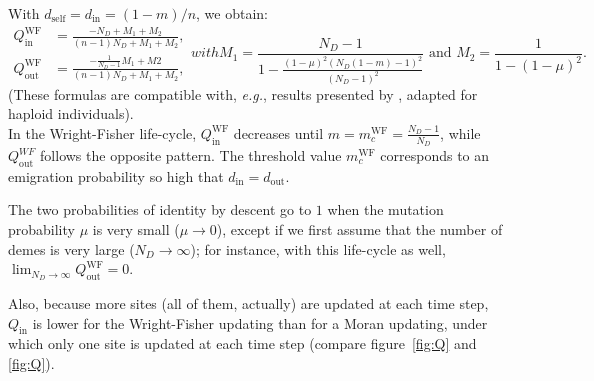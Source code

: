 \documentclass[11pt, letterpaper]{article}
\newcommand{\eg}{\textit{e.g.}}
\newcommand{\WF}{\textrm{WF}}
\newcommand{\self}{\textrm{self}}
\newcommand{\inn}{\textrm{in}}
\newcommand{\out}{\textrm{out}}
\newcommand{\din}{d_{\inn}}
\newcommand{\dself}{d_{\self}}
\newcommand{\dout}{d_{\out}}
\newcommand{\Qin}{Q_{\inn}}
\newcommand{\Qout}{Q_{\out}}
\newcommand{\ndemes}{N_D}
\begin{document}
With $\dself = \din = (1-m)/n$, we obtain:
%
\begin{subequations}\label{eq:QWF}
\begin{align}
\Qin^{\WF} &= \frac{-\ndemes + M_1 + M_2}{(n-1) \ndemes +M_1 + M_2}, \\
\Qout^{\WF} & = \frac{-\frac{1}{\ndemes-1}M_1 + M2}{(n-1) \ndemes +M_1 + M_2},
\end{align}
with
\begin{equation*}
M_1 = \frac{\ndemes-1}{1-\frac{(1-\mu )^2 (\ndemes (1-m)-1)^2}{(\ndemes-1)^2}} \textrm{ and }M_2 = \frac{1}{1-(1-\mu)^2}.
\end{equation*}
\end{subequations}
%
(These formulas are compatible with, \eg, results presented by \citet{CockerhamWeir1987}, adapted for haploid individuals).\\
In the Wright-Fisher life-cycle, $\Qin^{\WF}$ decreases until $m=m_c^{\WF} = \frac{\ndemes-1}{\ndemes}$, while $\Qout^{WF}$ follows the opposite pattern. The threshold value $m_c^{\WF}$ corresponds to an emigration probability so high that $\din = \dout$.

The two probabilities of identity by descent go to $1$ when the mutation probability $\mu$ is very small ($\mu \to 0$), except if we first assume that the number of demes is very large ($\ndemes \to \infty$); for instance, with this life-cycle as well, $\lim_{\ndemes \to \infty} \Qout^{\WF} = 0$. 

Also, because more sites (all of them, actually) are updated at each time step, $\Qin$ is lower for the Wright-Fisher updating than for a Moran updating, under which only one site is updated at each time step (compare figure~\ref{fig:Q} and \ref{fig:Q}). 
\end{document}
